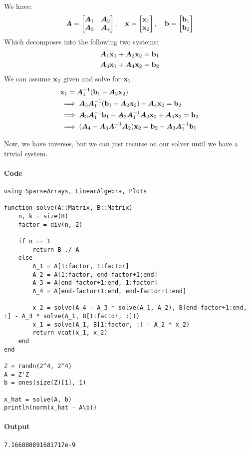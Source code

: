 \documentclass[]{exam}
\let\oldparagraph\paragraph
\renewcommand{\paragraph}[1]{\oldparagraph{#1}\mbox{}}
\begin{document}
\begin{questions}

\question
\hfill

We have:
\begin{gather*}
	\mA = \bmat{\mA_1 & \mA_2 \\ \mA_3 & \mA_4}, \quad \vx = \bmat{\vx_1 \\ \vx_2}, \quad \vb = \bmat{\vb_1 \\ \vb_2}
\end{gather*}
Which decomposes into the following two systems:
\begin{gather*}
	\mA_1\vx_1 + \mA_2 \vx_2 = \vb_1 \\
	\mA_3\vx_1 + \mA_4 \vx_2 = \vb_2
\end{gather*}
We can assume $\vx_2$ given and solve for $\vx_1$:
\begin{align*}
	&\vx_1 = \mA_1^{-1} (\vb_1 - \mA_2 \vx_2) \\
	&\implies \mA_3\mA_1^{-1} (\vb_1 - \mA_2 \vx_2) + \mA_4 \vx_2 = \vb_2 \\
	&\implies \mA_3\mA_1^{-1} \vb_1 - \mA_3\mA_1^{-1} \mA_2 \vx_2 + \mA_4 \vx_2 = \vb_2 \\
	&\implies (\mA_4 - \mA_3\mA_1^{-1} \mA_2) \vx_2 = \vb_2 - \mA_3\mA_1^{-1} \vb_1 
\end{align*}

Now, we have inverses, but we can just recurse on our solver until we have a trivial system.
	\paragraph{Code}
	\begin{lstlisting}
using SparseArrays, LinearAlgebra, Plots

function solve(A::Matrix, B::Matrix)
	n, k = size(B)
	factor = div(n, 2)

	if n == 1
		return B ./ A
	else
		A_1 = A[1:factor, 1:factor]
		A_2 = A[1:factor, end-factor+1:end]
		A_3 = A[end-factor+1:end, 1:factor]
		A_4 = A[end-factor+1:end, end-factor+1:end]
		
		x_2 = solve(A_4 - A_3 * solve(A_1, A_2), B[end-factor+1:end, :] - A_3 * solve(A_1, B[1:factor, :]))
		x_1 = solve(A_1, B[1:factor, :] - A_2 * x_2)
		return vcat(x_1, x_2)
	end
end

Z = randn(2^4, 2^4)
A = Z'Z
b = ones(size(Z)[1], 1)

x_hat = solve(A, b)
println(norm(x_hat - A\b))
	\end{lstlisting}
	\paragraph{Output}
	\begin{lstlisting}
7.166880891681717e-9
	\end{lstlisting}


\end{questions}
\end{document}
